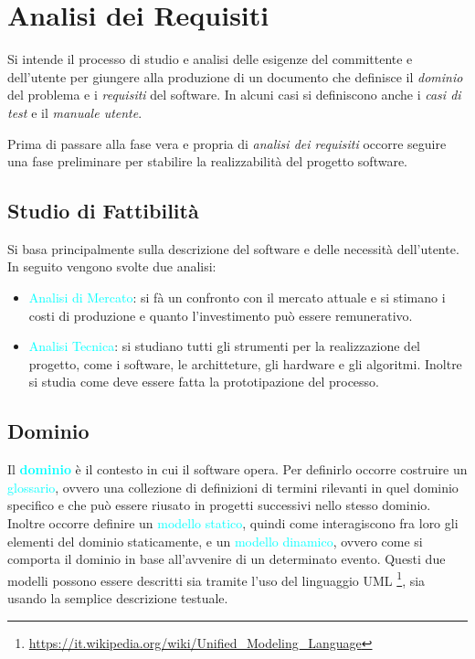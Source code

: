 \section{Analisi dei Requisiti}

\begin{definition}
    Si intende il processo di studio e analisi delle esigenze del committente e dell'utente per
    giungere alla produzione di un documento che definisce il \emph{dominio} del problema e i \emph{requisiti} del software.
    In alcuni casi si definiscono anche i \emph{casi di test} e il \emph{manuale utente}.
\end{definition}

Prima di passare alla fase vera e propria di \emph{analisi dei requisiti}
occorre seguire una fase preliminare per stabilire la realizzabilità
del progetto software.

\subsection{Studio di Fattibilità}

Si basa principalmente sulla descrizione del software e delle necessità
dell'utente. In seguito vengono svolte due analisi:

\begin{itemize}
    \item \textcolor{cyan}{Analisi di Mercato}: si fà un confronto con il mercato attuale e si stimano i costi di
        produzione e quanto l'investimento può essere remunerativo.
    \item \textcolor{cyan}{Analisi Tecnica}: si studiano tutti gli strumenti per la realizzazione del progetto,
        come i software, le architteture, gli hardware e gli algoritmi. Inoltre si studia come deve essere fatta la prototipazione
        del processo.
\end{itemize}

\subsection{Dominio}

Il \textbf{\textcolor{cyan}{dominio}} è il contesto in cui il software opera. Per definirlo occorre costruire
un \textcolor{cyan}{glossario}, ovvero una collezione di definizioni di termini rilevanti in quel dominio specifico e
che può essere riusato in progetti successivi nello stesso dominio. Inoltre occorre definire un \textcolor{cyan}{modello statico},
quindi come interagiscono fra loro gli elementi del dominio staticamente, e un \textcolor{cyan}{modello dinamico}, ovvero come si comporta il dominio
in base all'avvenire di un determinato evento. Questi due modelli possono essere descritti sia 
tramite l'uso del linguaggio UML \footnote{\url{https://it.wikipedia.org/wiki/Unified_Modeling_Language}}, sia usando la semplice descrizione testuale.


